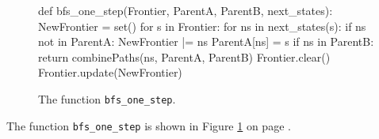 \begin{figure}[!ht]
\centering
\begin{python3code}
def bfs_one_step(Frontier, ParentA, ParentB, next_states):
    NewFrontier = set()
    for s in Frontier:
        for ns in next_states(s):
            if ns not in ParentA:
                NewFrontier |= { ns }
                ParentA[ns]  = s
                if ns in ParentB:
                    return combinePaths(ns, ParentA, ParentB)
    Frontier.clear()
    Frontier.update(NewFrontier)
\end{python3code}
\vspace*{-0.3cm}
\caption{The function \texttt{bfs\_one\_step}.}
\label{fig:Bidirectional-BFS.ipynb-2}
\end{figure}

\noindent
The function \texttt{bfs\_one\_step} is shown in Figure \ref{fig:Bidirectional-BFS.ipynb-2} on page
\pageref{fig:Bidirectional-BFS.ipynb-2}.
